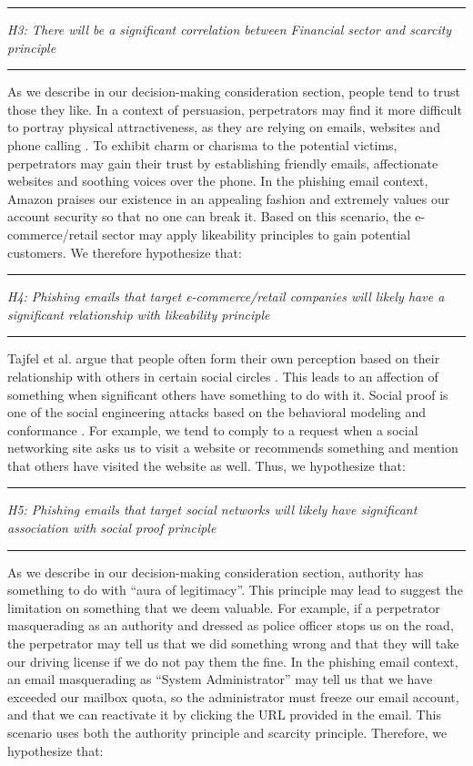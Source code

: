 \rule[0.5ex]{1\columnwidth}{1pt}

\textit{H3: There will be a significant correlation between Financial
sector and scarcity principle}

\rule[0.5ex]{1\columnwidth}{1pt}

As we describe in our decision-making consideration section, people
tend to trust those they like. In a context of persuasion, perpetrators
may find it more difficult to portray physical attractiveness, as
they are relying on emails, websites and phone calling \cite{dotterweich2006practicality}.
To exhibit charm or charisma to the potential victims, perpetrators
may gain their trust by establishing friendly emails, affectionate
websites and soothing voices over the phone. In the phishing email
context, Amazon praises our existence in an appealing fashion and
extremely values our account security so that no one can break it.
Based on this scenario, the e-commerce/retail sector may apply likeability
principles to gain potential customers. We therefore hypothesize that:

\rule[0.5ex]{1\columnwidth}{1pt}

\textit{H4: Phishing emails that target e-commerce/retail companies
will likely have a significant relationship with likeability principle}

\rule[0.5ex]{1\columnwidth}{1pt}

Tajfel et al. argue that people often form their own perception based
on their relationship with others in certain social circles \cite{tajfel2004social}.
This leads to an affection of something when significant others have
something to do with it. Social proof is one of the social engineering
attacks based on the behavioral modeling and conformance \cite{workman:2008}.
For example, we tend to comply to a request when a social networking
site asks us to visit a website or recommends something and mention
that others have visited the website as well. Thus, we hypothesize
that:

\rule[0.5ex]{1\columnwidth}{1pt}

\textit{H5: Phishing emails that target social networks will likely
have significant association with social proof principle }

\rule[0.5ex]{1\columnwidth}{1pt}

As we describe in our decision-making consideration section, authority
has something to do with \textquotedblleft aura of legitimacy\textquotedblright .
This principle may lead to suggest the limitation on something that
we deem valuable. For example, if a perpetrator masquerading as an
authority and dressed as police officer stops us on the road, the
perpetrator may tell us that we did something wrong and that they
will take our driving license if we do not pay them the fine. In the
phishing email context, an email masquerading as \textquotedblleft System
Administrator\textquotedblright{} may tell us that we have exceeded
our mailbox quota, so the administrator must freeze our email account,
and that we can reactivate it by clicking the URL provided in the
email. This scenario uses both the authority principle and scarcity
principle. Therefore, we hypothesize that:

